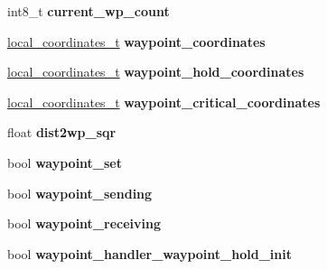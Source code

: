 \begin{DoxyCompactItemize}
\item 
\hypertarget{structcentral__data__t_ae88048cd97c0758982e04912d948d918}{int8\+\_\+t {\bfseries current\+\_\+wp\+\_\+count}}\label{structcentral__data__t_ae88048cd97c0758982e04912d948d918}

\item 
\hypertarget{structcentral__data__t_a29dd335f3af87a6ad7b74c066655e1f9}{\hyperlink{structlocal__coordinates__t}{local\+\_\+coordinates\+\_\+t} {\bfseries waypoint\+\_\+coordinates}}\label{structcentral__data__t_a29dd335f3af87a6ad7b74c066655e1f9}

\item 
\hypertarget{structcentral__data__t_ae7b2c231d69477007f10e5c2a8688f5f}{\hyperlink{structlocal__coordinates__t}{local\+\_\+coordinates\+\_\+t} {\bfseries waypoint\+\_\+hold\+\_\+coordinates}}\label{structcentral__data__t_ae7b2c231d69477007f10e5c2a8688f5f}

\item 
\hypertarget{structcentral__data__t_a3ae0fbdad2c002db90f8536f3cfea4f5}{\hyperlink{structlocal__coordinates__t}{local\+\_\+coordinates\+\_\+t} {\bfseries waypoint\+\_\+critical\+\_\+coordinates}}\label{structcentral__data__t_a3ae0fbdad2c002db90f8536f3cfea4f5}

\item 
\hypertarget{structcentral__data__t_a1006b9f14d5b6e41a563859196633576}{float {\bfseries dist2wp\+\_\+sqr}}\label{structcentral__data__t_a1006b9f14d5b6e41a563859196633576}

\item 
\hypertarget{structcentral__data__t_a41d931cb02d5a65a2ccda5c0ea28f482}{bool {\bfseries waypoint\+\_\+set}}\label{structcentral__data__t_a41d931cb02d5a65a2ccda5c0ea28f482}

\item 
\hypertarget{structcentral__data__t_a02661c27fdc8674d45b8b41c07b1dd04}{bool {\bfseries waypoint\+\_\+sending}}\label{structcentral__data__t_a02661c27fdc8674d45b8b41c07b1dd04}

\item 
\hypertarget{structcentral__data__t_abb72a16469ac7fa7a4dcfc0f7b97c113}{bool {\bfseries waypoint\+\_\+receiving}}\label{structcentral__data__t_abb72a16469ac7fa7a4dcfc0f7b97c113}

\item 
\hypertarget{structcentral__data__t_a91b8140f4fd35e0bf7ea9c0458fe5ae2}{bool {\bfseries waypoint\+\_\+handler\+\_\+waypoint\+\_\+hold\+\_\+init}}\label{structcentral__data__t_a91b8140f4fd35e0bf7ea9c0458fe5ae2}


\end{DoxyCompactItemize}
